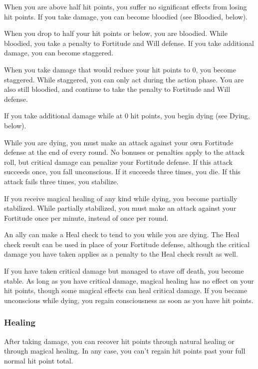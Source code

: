  When you are above half hit points, you suffer no significant effects from losing hit points. If you take damage, you can become bloodied (see Bloodied, below).

 When you drop to half your hit points or below, you are bloodied. While bloodied, you take a  penalty to Fortitude and Will defense. If you take additional damage, you can become staggered.

 When you take damage that would reduce your hit points to 0, you become staggered. While staggered, you can only act during the action phase. You are also still bloodied, and continue to take the  penalty to Fortitude and Will defense.

If you take additional damage while at 0 hit points, you begin dying (see Dying, below).

\label{Dying} While you are dying, you must make an attack against your own Fortitude defense at the end of every round. No bonuses or penalties apply to the attack roll, but critical damage can penalize your Fortitude defense. If this attack succeeds once, you fall unconscious. If it succeeds three times, you die. If this attack fails three times, you stabilize.

If you receive magical healing of any kind while dying, you become partially stabilized. While partially stabilized, you must make an attack against your Fortitude once per minute, instead of once per round.

An ally can make a Heal check to tend to you while you are dying. The Heal check result can be used in place of your Fortitude defense, although the critical damage you have taken applies as a penalty to the Heal check result as well.

\label{Stable}
If you have taken critical damage but managed to stave off death, you become stable. As long as you have critical damage, magical healing has no effect on your hit points, though some magical effects can heal critical damage. If you became unconscious while dying, you regain consciousness as soon as you have hit points.

\subsubsection{Healing}
After taking damage, you can recover hit points through natural healing or through magical healing. In any case, you can't regain hit points past your full normal hit point total.

